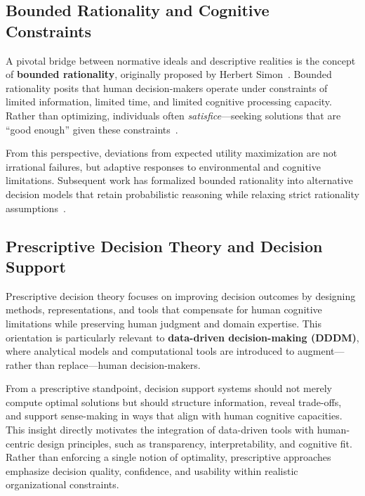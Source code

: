 \documentclass{sfuthesis}
\begin{document}
\subsection{Bounded Rationality and Cognitive Constraints}
A pivotal bridge between normative ideals and descriptive realities is the concept of \textbf{bounded rationality}, originally proposed by Herbert Simon~\cite{simon1972theories}. Bounded rationality posits that human decision-makers operate under constraints of limited information, limited time, and limited cognitive processing capacity. Rather than optimizing, individuals often \textit{satisfice}—seeking solutions that are “good enough” given these constraints~\cite{jones_bounded_1999,gigerenzer_what_2020}.\par
From this perspective, deviations from expected utility maximization are not irrational failures, but adaptive responses to environmental and cognitive limitations. Subsequent work has formalized bounded rationality into alternative decision models that retain probabilistic reasoning while relaxing strict rationality assumptions~\cite{navarro-martinez_boundedly_2018,katsikopoulos_one-reason_2008}.
\subsection{Prescriptive Decision Theory and Decision Support}
Prescriptive decision theory focuses on improving decision outcomes by designing methods, representations, and tools that compensate for human cognitive limitations while preserving human judgment and domain expertise. This orientation is particularly relevant to \textbf{data-driven decision-making (DDDM)}, where analytical models and computational tools are introduced to augment—rather than replace—human decision-makers.\par
From a prescriptive standpoint, decision support systems should not merely compute optimal solutions but should structure information, reveal trade-offs, and support sense-making in ways that align with human cognitive capacities. This insight directly motivates the integration of data-driven tools with human-centric design principles, such as transparency, interpretability, and cognitive fit. Rather than enforcing a single notion of optimality, prescriptive approaches emphasize decision quality, confidence, and usability within realistic organizational constraints.
\end{document}
